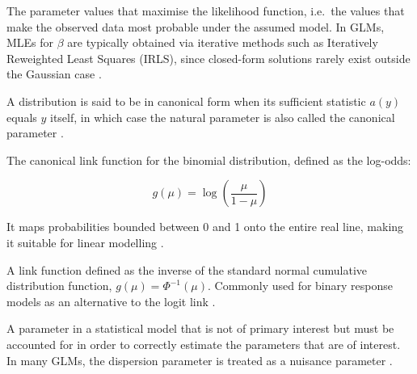 The parameter values that maximise the likelihood function, i.e.\ the values that make the observed data most probable under the assumed model. In GLMs, MLEs for $\beta$ are typically obtained via iterative methods such as Iteratively Reweighted Least Squares (IRLS), since closed-form solutions rarely exist outside the Gaussian case \citep{casella2002}.

A distribution is said to be in canonical form when its sufficient statistic $a(y)$ equals $y$ itself, in which case the natural parameter is also called the canonical parameter \citep{mccullagh1989}.

The canonical link function for the binomial distribution, defined as the log-odds:
\begin{mathbox}
\[
g(\mu) = \log\left(\frac{\mu}{1-\mu}\right)
\]
\end{mathbox}
It maps probabilities bounded between 0 and 1 onto the entire real line, making it suitable for linear modelling \citep{dobson2018}.

A link function defined as the inverse of the standard normal cumulative distribution function, $g(\mu) = \Phi^{-1}(\mu)$. Commonly used for binary response models as an alternative to the logit link \citep{dobson2018}.

A parameter in a statistical model that is not of primary interest but must be accounted for in order to correctly estimate the parameters that are of interest. In many GLMs, the dispersion parameter is treated as a nuisance parameter \citep{casella2002}.

\Reflection
\tbc
